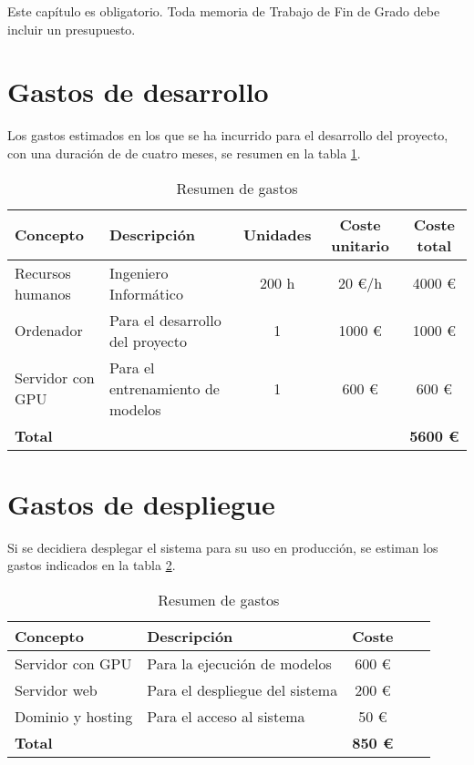 Este capítulo es obligatorio. Toda memoria de Trabajo de Fin de Grado debe incluir un presupuesto.

\section{Gastos de desarrollo}
Los gastos estimados en los que se ha incurrido para el desarrollo del proyecto, con una duración de de cuatro meses,
 se resumen en la tabla \ref{tabla_presupuesto_desarrollo}. 

\begin{table}[h]
   \centering
   \small
   \caption{Resumen de gastos}
   \begin{tabular}{|l|l|c|c|c|}
      \hline
      \textbf{Concepto} & \textbf{Descripción} & \textbf{Unidades} & \textbf{Coste unitario} & \textbf{Coste total} \\ \hline
      Recursos humanos & Ingeniero Informático & 200 h & 20 €/h & 4000 € \\ \hline
      Ordenador & Para el desarrollo del proyecto & 1 & 1000 € & 1000 € \\ \hline
      Servidor con GPU & Para el entrenamiento de modelos & 1 & 600 € & 600 € \\ \hline
      \textbf{Total} & & & & \textbf{5600 €} \\ \hline
   \end{tabular}
   \label{tabla_presupuesto_desarrollo}
\end{table}

\section{Gastos de despliegue}
Si se decidiera desplegar el sistema para su uso en producción, se estiman los gastos indicados
en la tabla \ref{tabla_presupuesto_despliegue}.

\begin{table}[h]
   \centering
   \small
   \caption{Resumen de gastos}
   \begin{tabular}{|l|l|c|c|c|}
      \hline
      \textbf{Concepto} & \textbf{Descripción} & \textbf{Coste} \\ \hline
      Servidor con GPU & Para la ejecución de modelos  & 600 € \\ \hline
      Servidor web & Para el despliegue del sistema  & 200 € \\ \hline
      Dominio y hosting & Para el acceso al sistema  & 50 € \\ \hline
      \textbf{Total}  & & \textbf{850 €} \\ \hline
   \end{tabular}
   \label{tabla_presupuesto_despliegue}
\end{table}